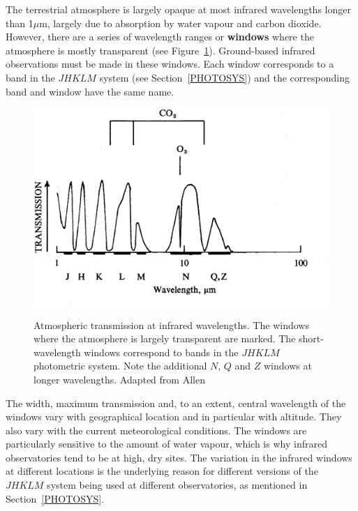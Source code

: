 \documentclass[twoside,11pt]{article}
\begin{document}
The terrestrial atmosphere is largely opaque at most infrared wavelengths
longer than 1$\mu$m, largely due to absorption by water vapour and
carbon dioxide.  However, there are a series of wavelength ranges or
{\bf windows} where the atmosphere is mostly transparent (see
Figure~\ref{IRWINDOWS}).  Ground-based infrared observations must be
made in these windows.  Each window corresponds to a band in the $JHKLM$
system (see Section~\ref{PHOTOSYS}) and the corresponding band and window
have the same name.

\begin{figure}[htbp]
   \centering 
   \includegraphics[totalheight=3.5in]{sc6_irwindows.ps}
   \begin{quote}
   \caption[Atmospheric transmission at infrared wavelengths]
    {Atmospheric transmission at infrared wavelengths.  The windows where
    the atmosphere is largely transparent are marked.  The short-wavelength
    windows correspond to bands in the $JHKLM$ photometric system.  Note
    the additional $N$, $Q$ and $Z$ windows at longer wavelengths.  Adapted
    from Allen\cite{ALLEN75}
   \label{IRWINDOWS} }
   \end{quote}
\end{figure}

The width, maximum transmission and, to an extent, central wavelength
of the windows vary with geographical location and in particular with
altitude.  They also vary with the current meteorological conditions.
The windows are particularly sensitive to the amount of water
vapour, which is why infrared observatories tend to be at high, dry sites.
The variation in the infrared windows at different locations is the
underlying reason for different versions of the $JHKLM$ system being
used at different observatories, as mentioned in Section~\ref{PHOTOSYS}.
\end{document}
